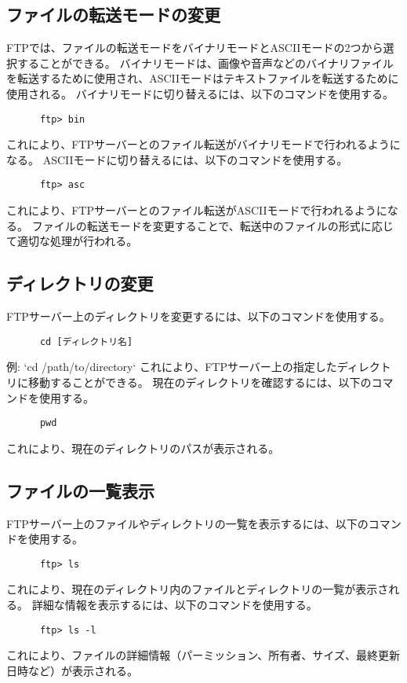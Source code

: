 \documentclass[a4paper,10pt]{jsarticle}
\begin{document}
    \subsection{ファイルの転送モードの変更}
    FTPでは、ファイルの転送モードをバイナリモードとASCIIモードの2つから選択することができる。
    バイナリモードは、画像や音声などのバイナリファイルを転送するために使用され、ASCIIモードはテキストファイルを転送するために使用される。
    バイナリモードに切り替えるには、以下のコマンドを使用する。
    \begin{lstlisting}
      ftp> bin
    \end{lstlisting}
    これにより、FTPサーバーとのファイル転送がバイナリモードで行われるようになる。
    ASCIIモードに切り替えるには、以下のコマンドを使用する。
    \begin{lstlisting}
      ftp> asc
    \end{lstlisting}
    これにより、FTPサーバーとのファイル転送がASCIIモードで行われるようになる。
    ファイルの転送モードを変更することで、転送中のファイルの形式に応じて適切な処理が行われる。

    \subsection{ディレクトリの変更}
    FTPサーバー上のディレクトリを変更するには、以下のコマンドを使用する。
    \begin{lstlisting}
      cd [ディレクトリ名]
    \end{lstlisting}
    例: `cd /path/to/directory`
    これにより、FTPサーバー上の指定したディレクトリに移動することができる。
    現在のディレクトリを確認するには、以下のコマンドを使用する。
    \begin{lstlisting}
      pwd
    \end{lstlisting}
    これにより、現在のディレクトリのパスが表示される。

    \subsection{ファイルの一覧表示}
    FTPサーバー上のファイルやディレクトリの一覧を表示するには、以下のコマンドを使用する。
    \begin{lstlisting}
      ftp> ls
    \end{lstlisting}
    これにより、現在のディレクトリ内のファイルとディレクトリの一覧が表示される。
    詳細な情報を表示するには、以下のコマンドを使用する。
    \begin{lstlisting}
      ftp> ls -l
    \end{lstlisting}
    これにより、ファイルの詳細情報（パーミッション、所有者、サイズ、最終更新日時など）が表示される。
\end{document}
